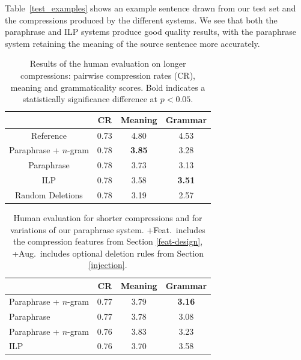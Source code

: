 \documentclass[11pt]{article}
\begin{document}
Table~\ref{test_examples} shows an example sentence drawn from our
test set and the compressions produced by the different systems. We
see that both the paraphrase and ILP systems produce good quality
results, with the paraphrase system retaining the meaning of the
source sentence more accurately.

 \begin{table}
   \small
   \begin{center}
     \begin{tabular}{|c|c|c|c|}
       \hline
       & CR & Meaning & Grammar \\
       \hline
       Reference & 0.73 &  4.80 & 4.53 \\
       \hline
       \hline
       Paraphrase + $n$-gram & 0.78 & {\bf 3.85} & 3.28 \\
       Paraphrase & 0.78 & 3.73 & 3.13 \\
       ILP & 0.78 & 3.58 & {\bf 3.51} \\
       \hline
       \hline
       Random Deletions & 0.78 & 3.19 & 2.57 \\
       \hline
     \end{tabular}
   \end{center}
   \normalsize
   \caption{Results of the human evaluation on longer compressions:
     pairwise compression rates (CR), meaning and grammaticality scores. 
     Bold indicates a statistically significance difference at $p <
     0.05$.}
   \label{human_judgments}
 \end{table}

\begin{table}
   \small
   \begin{center}
     \begin{tabular}{|l|c|c|c|}
       \hline
       & CR & Meaning & Grammar \\
       \hline
       Paraphrase + $n$-gram & 0.77 & 3.79 & {\bf 3.16} \\
       Paraphrase & 0.77 & 3.78 & 3.08 \\
       \hline
       \hline
       Paraphrase + $n$-gram & 0.76 & 3.83 & 3.23 \\
       ILP & 0.76 & 3.70 & 3.58 \\
       \hline
    \end{tabular}
   \end{center}
   \normalsize
   \caption{Human evaluation for shorter compressions and for
     variations of our paraphrase system.  +Feat.\ includes the
     compression features from Section \ref{feat-design}, +Aug.\
     includes optional deletion rules from Section
     \ref{injection}. \vspace{-.5cm}}
   \label{comparison}
 \end{table}
\end{document}
